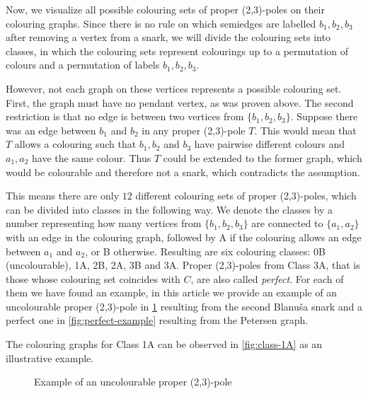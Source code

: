 \label{sec:colouring-classes}

Now, we visualize all possible colouring sets of proper (2,3)-poles on their colouring graphs. Since there is no rule on which semiedges are labelled $b_1,b_2,b_3$ after removing a vertex from a snark, we will divide the colouring sets into classes, in which the colouring sets represent colourings up to a permutation of colours and a permutation of labels $b_1,b_2,b_3$.

However, not each graph on these vertices represents a possible colouring set. First, the graph must have no pendant vertex, as was proven above. The second restriction is that no edge is between two vertices from $\{b_1,b_2,b_3\}$. Suppose there was an edge between $b_1$ and $b_2$ in any proper (2,3)-pole $T$. This would mean that $T$ allows a colouring such that $b_1,b_2$ and $b_3$ have pairwise different colours and $a_1,a_2$ have the same colour. Thus $T$ could be extended to the former graph, which would be colourable and therefore not a snark, which contradicts the assumption.

This means there are only $12$ different colouring sets of proper (2,3)-poles, which can be divided into classes in the following way. We denote the classes by a number representing how many vertices from $\{b_1,b_2,b_3\}$ are connected to $\{a_1,a_2\}$ with an edge in the colouring graph, followed by A if the colouring allows an edge between $a_1$ and $a_2$, or B otherwise. Resulting are six colouring classes: 0B (uncolourable), 1A, 2B, 2A, 3B and 3A. Proper (2,3)-poles from Class 3A, that is those whose colouring set coincides with $C$, are also called \textit{perfect}. For each of them we have found an example, in this article we provide an example of an uncolourable proper (2,3)-pole in \cref{fig:uncolourable-example} resulting from the second Blanuša snark and a perfect one in \cref{fig:perfect-example} resulting from the Petersen graph.

The colouring graphs for Class 1A can be observed in \cref{fig:class-1A} as an illustrative example.

\begin{figure}
	\centering
	\scalebox{0.7}{
		
	}
	\caption{Example of an uncolourable proper (2,3)-pole}
	\label{fig:uncolourable-example}
\end{figure}

